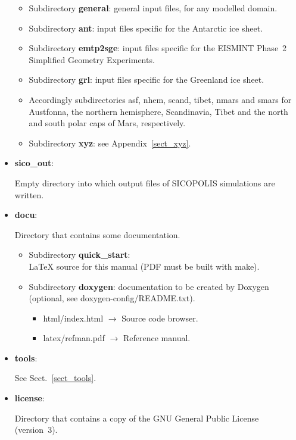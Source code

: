 \documentclass[12pt,a4paper]{article}
\begin{document}
\begin{itemize}
\begin{itemize}
\item
Subdirectory \textbf{general}: general input files, for any modelled domain.

\item
Subdirectory \textbf{ant}: input files specific for the Antarctic ice sheet.

\item
Subdirectory \textbf{emtp2sge}: input files specific for the EISMINT Phase~2 Simplified Geometry Experiments.

\item
Subdirectory \textbf{grl}: input files specific for the Greenland ice sheet.

\item
Accordingly subdirectories asf, nhem, scand, tibet, nmars and smars for Austfonna, the northern hemisphere, Scandinavia, Tibet and the north and south polar caps of Mars, respectively.

\item
Subdirectory \textbf{xyz}: see Appendix~\ref{sect_xyz}.

\end{itemize}

\item \textbf{sico\_out}:

Empty directory into which output files of SICOPOLIS simulations are written.

\item \textbf{docu}:

Directory that contains some documentation.

\begin{itemize}

\item
Subdirectory \textbf{quick\_start}:\\
\LaTeX{} source for this manual (PDF must be built with make).

\item
Subdirectory \textbf{doxygen}: documentation to be created by Doxygen\\
(optional, see doxygen-config/README.txt).

\begin{itemize}

\item html/index.html $\longrightarrow$ Source code browser.

\item latex/refman.pdf $\longrightarrow$ Reference manual.

\end{itemize}

\end{itemize}

\item \textbf{tools}:

See Sect.~\ref{sect_tools}.

\item \textbf{license}:

Directory that contains a copy of the GNU General Public License (version~3).

\end{itemize}
\end{document}
